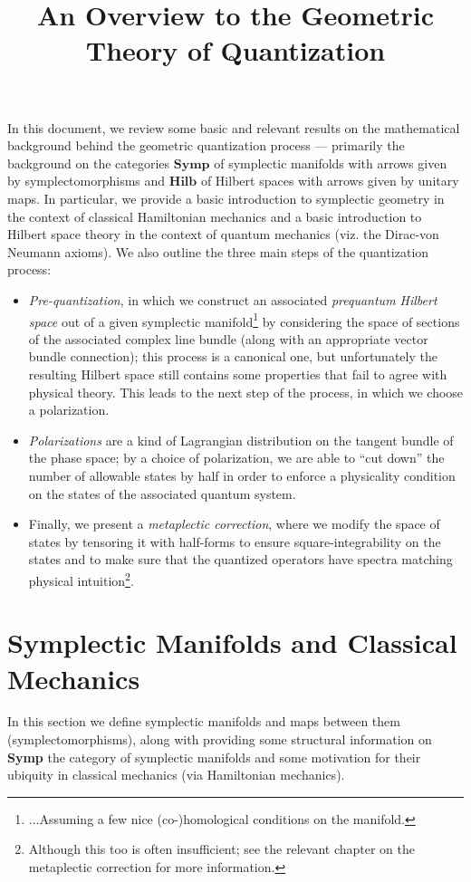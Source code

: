 \documentclass{tufte-handout}
\title{An Overview to the Geometric Theory of Quantization}
\begin{document}
In this document, we review some basic and relevant results on the mathematical background behind the geometric quantization process --- primarily the background on the categories $\mathbf{Symp}$ of symplectic manifolds with arrows given by symplectomorphisms and $\mathbf{Hilb}$ of Hilbert spaces with arrows given by unitary maps. In particular, we provide a basic introduction to symplectic geometry in the context of classical Hamiltonian mechanics and a basic introduction to Hilbert space theory in the context of quantum mechanics (viz. the Dirac-von Neumann axioms). We also outline the three main steps of the quantization process:
\begin{itemize}
\item \emph{Pre-quantization}, in which we construct an associated \emph{prequantum Hilbert space} out of a given symplectic manifold\footnote{...Assuming a few nice (co-)homological conditions on the manifold.} by considering the space of sections of the associated complex line bundle (along with an appropriate vector bundle connection); this process is a canonical one, but unfortunately the resulting Hilbert space still contains some properties that fail to agree with physical theory. This leads to the next step of the process, in which we choose a polarization.
\item \emph{Polarizations} are a kind of Lagrangian distribution on the tangent bundle of the phase space; by a choice of polarization, we are able to ``cut down'' the number of allowable states by half in order to enforce a physicality condition on the states of the associated quantum system.
\item Finally, we present a \emph{metaplectic correction}, where we modify the space of states by tensoring it with half-forms to ensure square-integrability on the states and to make sure that the quantized operators have spectra matching physical intuition\footnote{Although this too is often insufficient; see the relevant chapter on the metaplectic correction for more information.}.
\end{itemize}


\section{Symplectic Manifolds and Classical Mechanics}
In this section we define symplectic manifolds and maps between them (symplectomorphisms), along with providing some structural information on \textbf{Symp} the category of symplectic manifolds and some motivation for their ubiquity in classical mechanics (via Hamiltonian mechanics).
\end{document}

